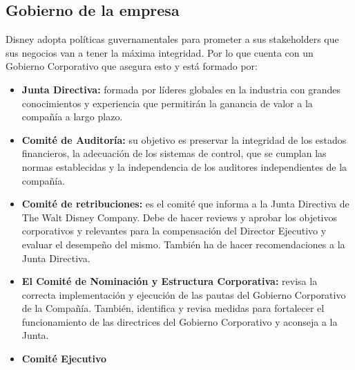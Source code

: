 \subsection{Gobierno de la empresa}
Disney adopta políticas guvernamentales para prometer a sus stakeholders que sus negocios van a tener la máxima integridad. Por lo que cuenta con un Gobierno Corporativo que asegura esto y está formado por:

\begin{itemize}

\item
\textbf{Junta Directiva:} formada por líderes globales en la industria con grandes conocimientos y experiencia que permitirán la ganancia de valor a la compañía a largo plazo.

\item
\textbf{Comité de Auditoría:} su objetivo es preservar la integridad de los estados financieros, la adecuación de los sistemas de control, que se cumplan las normas establecidas y la independencia de los auditores independientes de la compañía.

\item
\textbf{Comité de retribuciones:} es el comité que informa a la Junta Directiva de The Walt Disney Company. Debe de hacer reviews y aprobar los objetivos corporativos y relevantes para la compensación del Director Ejecutivo y evaluar el desempeño del mismo. También ha de hacer recomendaciones a la Junta Directiva.

\item
\textbf{El Comité de Nominación y Estructura Corporativa:} revisa la correcta implementación y ejecución de las pautas del Gobierno Corporativo de la Compañía. También, identifica y revisa medidas para fortalecer el funcionamiento de las directrices del Gobierno Corporativo y aconseja a la Junta.

\item
\textbf{Comité Ejecutivo}

\end{itemize}